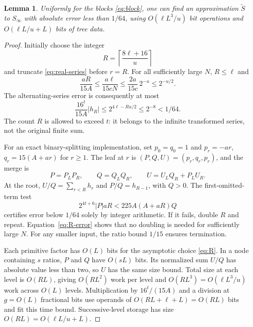 \documentclass[11pt]{article}
\numberwithin{equation}{section}
\newtheorem{lemma}[theorem]{Lemma}
\theoremstyle{definition}
\begin{document}
\begin{lemma}\label{lem:real-cost}
Uniformly for the blocks \eqref{eq:block}, one can find an
approximation $\widetilde S$ to $S_\infty$ with absolute error
less than $1/64$, using $O(\ell L^3/u)$ bit operations and
$O(\ell L/u+L)$ bits of tree data.
\end{lemma}

\begin{proof}
Initially choose the integer
\begin{equation}\label{eq:R}
 R=\left\lceil\frac{8\ell+16}{u}\right\rceil
\end{equation}
and truncate \eqref{eq:real-series} before $r=R$.
For all sufficiently large $N$, $R\le\ell$ and
\[
 \frac{aR}{15A}
 \le\frac{a\ell}{15cN}
 \le\frac{2a}{15c}\,2^{-u}
 \le 2^{-u/2}.
\]
The alternating-series error is consequently at most
\begin{equation}\label{eq:R-error}
 \frac{16^t}{15A}|h_R|
 \le 2^{4\ell-Ru/2}\le2^{-8}<1/64.
\end{equation}
The count $R$ is allowed to exceed $t$: it belongs to the
infinite transformed series, not the original finite sum.

For an exact binary-splitting implementation, set $p_0=q_0=1$
and $p_r=-ar$, $q_r=15(A+ar)$ for $r\ge1$.
The leaf at $r$ is $(P,Q,U)=(p_r,q_r,p_r)$, and the merge is
\begin{equation}\label{eq:real-merge}
 P=P_LP_R,\qquad Q=Q_LQ_R,\qquad
 U=U_LQ_R+P_LU_R.
\end{equation}
At the root,
$U/Q=\sum_{r<R}h_r$ and $P/Q=h_{R-1}$, with $Q>0$.
The first-omitted-term test
\begin{equation}\label{eq:real-certificate}
 2^{4t+6}|P|aR<225A(A+aR)Q
\end{equation}
certifies error below $1/64$ solely by integer arithmetic.
If it fails, double $R$ and repeat. Equation~\eqref{eq:R-error}
shows that no doubling is needed for sufficiently large $N$.
For any smaller input, the ratio bound $1/15$ ensures termination.

Each primitive factor has $O(L)$ bits for the asymptotic choice
\eqref{eq:R}. In a node containing $s$ ratios, $P$ and $Q$
have $O(sL)$ bits. Its normalized sum $U/Q$ has absolute value
less than two, so $U$ has the same size bound. Total size at
each level is $O(RL)$, giving $O(RL^2)$ work per level and
$O(RL^3)=O(\ell L^3/u)$ work across $O(L)$ levels.
Multiplication by $16^t/(15A)$ and a division at $g=O(L)$
fractional bits use operands of
$O(RL+\ell+L)=O(RL)$ bits and fit this time bound.
Successive-level storage has size $O(RL)=O(\ell L/u+L)$.
\end{proof}
\end{document}
